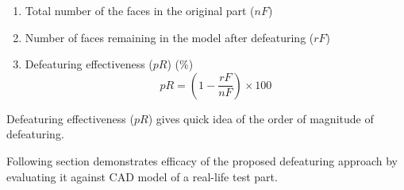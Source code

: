 	\begin{enumerate}
	[noitemsep,topsep=2pt,parsep=2pt,partopsep=2pt]
	\item Total number of the faces in the original part ($nF$)
	\item Number of faces remaining in the model after defeaturing ($rF$)
	\item Defeaturing effectiveness ($pR$) (\%)
	\begin{equation}\label{eqn:defeaturing:effectiveness}  pR = (1 - \frac{rF}{nF}) \times 100\end{equation}
	\end{enumerate}

Defeaturing effectiveness ($pR$) gives quick idea of the order of magnitude of defeaturing.

Following section demonstrates efficacy of the proposed defeaturing approach by evaluating it against CAD model of a real-life test part.


